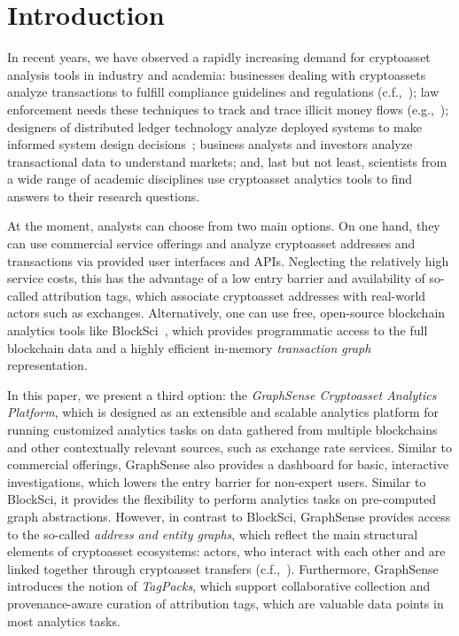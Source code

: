 
\section{Introduction}
\label{sec:introduction}

In recent years, we have observed a rapidly increasing demand for cryptoasset analysis tools in industry and academia: businesses dealing with cryptoassets analyze transactions to fulfill compliance guidelines and regulations (c.f.,~\cite{sackheim:2020,fatf:2019}); law enforcement needs these techniques to track and trace illicit money flows (e.g.,~\cite{PaquetClouson:2019aa,PaquetClouson:2019bb}); designers of distributed ledger technology analyze deployed systems to make informed system design decisions~\cite{Stuetz:2020a}; business analysts and investors analyze transactional data to understand markets; and, last but not least, scientists from a wide range of academic disciplines use cryptoasset analytics tools to find answers to their research questions.

At the moment, analysts can choose from two main options. On one hand, they can use commercial service offerings and analyze cryptoasset addresses and transactions via provided user interfaces and APIs. Neglecting the relatively high service costs, this has the advantage of a low entry barrier and availability of so-called attribution tags, which associate cryptoasset addresses with real-world actors such as exchanges. Alternatively, one can use free, open-source blockchain analytics tools like BlockSci~\cite{Kalodner:2020a}, which provides programmatic access to the full blockchain data and a highly efficient in-memory \emph{transaction graph} representation.

In this paper, we present a third option: the \emph{GraphSense Cryptoasset Analytics Platform}, which is designed as an extensible and scalable analytics platform for running customized analytics tasks on data gathered from multiple blockchains and other contextually relevant sources, such as exchange rate services. Similar to commercial offerings, GraphSense also provides a dashboard for basic, interactive investigations, which lowers the entry barrier for non-expert users. Similar to BlockSci, it provides the flexibility to perform analytics tasks on pre-computed graph abstractions. However, in contrast to BlockSci, GraphSense provides access to the so-called \emph{address and entity graphs}, which reflect the main structural elements of cryptoasset ecosystems: actors, who interact with each other and are linked together through cryptoasset transfers (c.f.,~\cite{Reid:2013aa}). Furthermore, GraphSense introduces the notion of \emph{TagPacks}, which support collaborative collection and provenance-aware curation of attribution tags, which are valuable data points in most analytics tasks.

